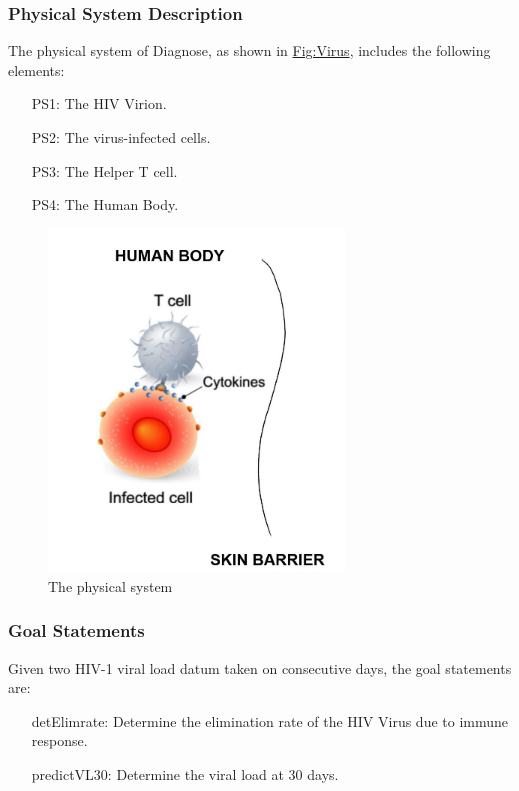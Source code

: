 \documentclass[12pt]{article}
\begin{document}
\subsubsection{Physical System Description}
\label{Sec:PhysSyst}
The physical system of Diagnose, as shown in \hyperref[Figure:Virus]{Fig:Virus}, includes the following elements:

\begin{itemize}
\item[PS1:]{The HIV Virion.}
\item[PS2:]{The virus-infected cells.}
\item[PS3:]{The Helper T cell.}
\item[PS4:]{The Human Body.}
\end{itemize}
\begin{figure}
\begin{center}
\includegraphics[width=0.7\textwidth]{../../../datafiles/Diagnose/Virusinbody.JPG}
\caption{The physical system}
\label{Figure:Virus}
\end{center}
\end{figure}
\subsubsection{Goal Statements}
\label{Sec:GoalStmt}
Given two HIV-1 viral load datum taken on consecutive days, the goal statements are:

\begin{itemize}
\item[detElimrate:\phantomsection\label{detElimrate}]{Determine the elimination rate of the HIV Virus due to immune response.}
\item[predictVL30:\phantomsection\label{predictVL30}]{Determine the viral load at 30 days.}
\end{itemize}
\end{document}
